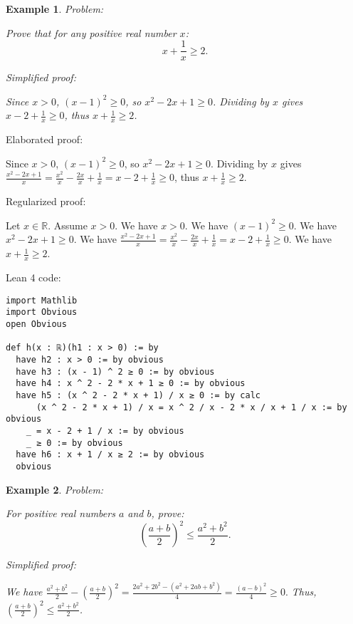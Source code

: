 \documentclass{article}
\newtheorem{example}{Example}
\begin{document}
\begin{example}
Problem:
\begin{tcolorbox}[colback=yellow!10, width=\linewidth]
Prove that for any positive real number $x$:
    $$x + \frac{1}{x} \geq 2.$$
\end{tcolorbox}

Simplified proof:
\begin{tcolorbox}[colback=blue!10, width=\linewidth]
Since $x>0$, $(x-1)^2 \ge 0$, so $x^2 - 2x + 1 \ge 0$. Dividing by $x$ gives $x - 2 + \frac{1}{x} \ge 0$, thus $x + \frac{1}{x} \ge 2$.
\end{tcolorbox}
\end{example}

Elaborated proof:
\begin{tcolorbox}[colback=green!10, width=\linewidth]
Since $x>0$, $(x-1)^2 \ge 0$, so $x^2 - 2x + 1 \ge 0$. Dividing by $x$ gives $\frac{x^2 - 2x + 1}{x} = \frac{x^2}{x} - \frac{2x}{x} + \frac{1}{x} = x - 2 + \frac{1}{x} \ge 0$, thus $x + \frac{1}{x} \ge 2$.
\end{tcolorbox}

Regularized proof:
\begin{tcolorbox}[colback=red!10, width=\linewidth]
Let $x\in\mathbb{R}$. Assume $x > 0$.
We have $x > 0$. We have ${(x-1)}^2 \ge 0$. We have $x^2 - 2x + 1 \ge 0$. We have $\frac{x^2 - 2x + 1}{x} = \frac{x^2}{x} - \frac{2x}{x} + \frac{1}{x} = x - 2 + \frac{1}{x} \ge 0$. We have $x + \frac{1}{x} \ge 2$.
\end{tcolorbox}

Lean 4 code:
\begin{tcolorbox}[colback=white!10, width=\linewidth]
\begin{lstlisting}[language=Lean4]
import Mathlib
import Obvious
open Obvious

def h(x : ℝ)(h1 : x > 0) := by
  have h2 : x > 0 := by obvious
  have h3 : (x - 1) ^ 2 ≥ 0 := by obvious
  have h4 : x ^ 2 - 2 * x + 1 ≥ 0 := by obvious
  have h5 : (x ^ 2 - 2 * x + 1) / x ≥ 0 := by calc
      (x ^ 2 - 2 * x + 1) / x = x ^ 2 / x - 2 * x / x + 1 / x := by obvious
    _ = x - 2 + 1 / x := by obvious
    _ ≥ 0 := by obvious
  have h6 : x + 1 / x ≥ 2 := by obvious
  obvious

\end{lstlisting}
\end{tcolorbox}


\begin{example}
Problem:
\begin{tcolorbox}[colback=yellow!10, width=\linewidth]
For positive real numbers $a$ and $b$, prove:
    $$\left(\frac{a+b}{2}\right)^2 \leq \frac{a^2+b^2}{2}.$$
\end{tcolorbox}

Simplified proof:
\begin{tcolorbox}[colback=blue!10, width=\linewidth]
We have
$ \frac{a^2+b^2}{2} - \left(\frac{a+b}{2}\right)^2 = \frac{2a^2+2b^2-(a^2+2ab+b^2)}{4} = \frac{(a-b)^2}{4} \ge 0. $
Thus, $\left(\frac{a+b}{2}\right)^2 \leq \frac{a^2+b^2}{2}$.
\end{tcolorbox}
\end{example}
\end{document}
